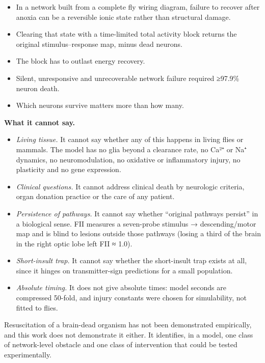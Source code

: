 \documentclass[11pt]{article}
\providecommand{\tightlist}{\setlength{\itemsep}{0pt}\setlength{\parskip}{0pt}}
\begin{document}
\begin{itemize}
\tightlist
\item
  In a network built from a complete fly wiring diagram, failure to recover after anoxia can be a reversible ionic state rather than structural damage.
\item
  Clearing that state with a time-limited total activity block returns the original stimulus--response map, minus dead neurons.
\item
  The block has to outlast energy recovery.
\item
  Silent, unresponsive and unrecoverable network failure required ≥97.9\% neuron death.
\item
  Which neurons survive matters more than how many.
\end{itemize}

\textbf{What it cannot say.}

\begin{itemize}
\tightlist
\item
  \emph{Living tissue.} It cannot say whether any of this happens in living flies or mammals. The model has no glia beyond a clearance rate, no Ca²⁺ or Na⁺ dynamics, no neuromodulation, no oxidative or inflammatory injury, no plasticity and no gene expression.
\item
  \emph{Clinical questions.} It cannot address clinical death by neurologic criteria, organ donation practice or the care of any patient.
\item
  \emph{Persistence of pathways.} It cannot say whether ``original pathways persist'' in a biological sense. FII measures a seven-probe stimulus → descending/motor map and is blind to lesions outside those pathways (losing a third of the brain in the right optic lobe left FII ≈ 1.0).
\item
  \emph{Short-insult trap.} It cannot say whether the short-insult trap exists at all, since it hinges on transmitter-sign predictions for a small population.
\item
  \emph{Absolute timing.} It does not give absolute times: model seconds are compressed 50-fold, and injury constants were chosen for simulability, not fitted to flies.
\end{itemize}

Resuscitation of a brain-dead organism has not been demonstrated empirically, and this work does not demonstrate it either. It identifies, in a model, one class of network-level obstacle and one class of intervention that could be tested experimentally.
\end{document}
